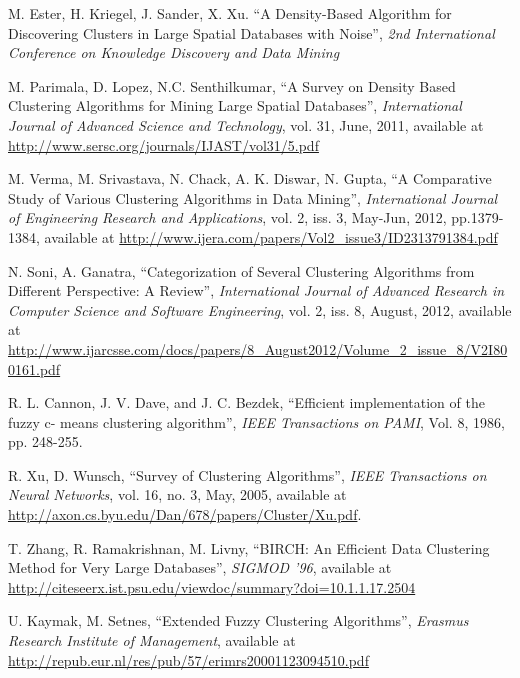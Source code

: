 \documentclass[conference, 10pt]{IEEEtran}
\begin{document}
\begin{thebibliography}{1}
 M. Ester, H. Kriegel, J. Sander, X. Xu. ``A Density-Based Algorithm for Discovering Clusters in Large Spatial Databases with Noise'', \emph{2nd International Conference on Knowledge Discovery and Data Mining}

 M. Parimala, D. Lopez, N.C. Senthilkumar, ``A Survey on Density Based Clustering Algorithms for Mining Large Spatial Databases'', \emph{International Journal of Advanced Science and Technology}, vol. 31, June, 2011, available at
\url{http://www.sersc.org/journals/IJAST/vol31/5.pdf}

 M. Verma, M. Srivastava, N. Chack, A. K. Diswar, N. Gupta, ``A Comparative Study of Various Clustering Algorithms in Data Mining'', \emph{International Journal of Engineering Research and Applications}, vol. 2, iss. 3, May-Jun, 2012, pp.1379-1384, available at
\url{http://www.ijera.com/papers/Vol2_issue3/ID2313791384.pdf}

 N. Soni, A. Ganatra, ``Categorization of Several Clustering Algorithms from Different Perspective: A Review'', \emph{International Journal of Advanced Research in Computer Science and Software Engineering}, vol. 2, iss. 8, August, 2012, available at
\url{http://www.ijarcsse.com/docs/papers/8_August2012/Volume_2_issue_8/V2I800161.pdf}

 R. L. Cannon, J. V. Dave, and J. C. Bezdek, ``Efficient implementation of the fuzzy c- means clustering algorithm'', \emph{IEEE Transactions on PAMI}, Vol. 8, 1986, pp. 248-255.

 R. Xu, D. Wunsch, ``Survey of Clustering Algorithms'', \emph{IEEE Transactions on Neural Networks}, vol. 16, no. 3, May, 2005, available at 
\url{http://axon.cs.byu.edu/Dan/678/papers/Cluster/Xu.pdf}.

 T. Zhang, R. Ramakrishnan, M. Livny, ``BIRCH: An Efficient Data Clustering Method for Very Large Databases'', \emph{SIGMOD ’96}, available at
\url{http://citeseerx.ist.psu.edu/viewdoc/summary?doi=10.1.1.17.2504}

 U. Kaymak, M. Setnes, ``Extended Fuzzy Clustering Algorithms'', \emph{Erasmus Research Institute of Management}, available at
\url{http://repub.eur.nl/res/pub/57/erimrs20001123094510.pdf}

\end{thebibliography}

\end{document}
